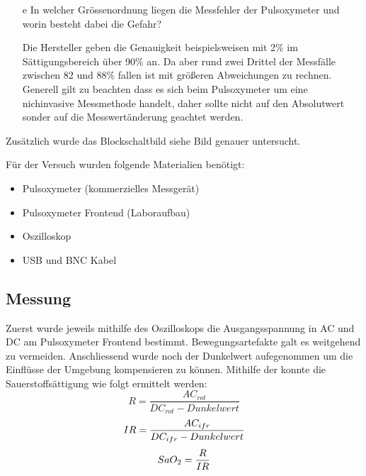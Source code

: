 \documentclass[11pt]{scrartcl}
\begin{document}
\begin{itemize}
\begin{equation}
        \end{equation}
        \item[e] In welcher Grössenordnung liegen die Messfehler der Pulsoxymeter und worin
        besteht dabei die Gefahr? 
        \item[] Die Hersteller geben die Genauigkeit beispielsweisen mit 2\% im Sättigungsbereich über 90\% an. 
        Da aber rund zwei Drittel der Messfälle zwischen 82 und 88\% fallen ist mit größeren Abweichungen zu rechnen. 
        Generell gilt zu beachten dass es sich beim Pulsoxymeter um eine nichinvasive Messmethode handelt, 
        daher sollte nicht auf den Absolutwert sonder auf die Messwertänderung geachtet werden. 
    \end{itemize}

    Zusätzlich wurde das Blockschaltbild siehe Bild genauer untersucht. 


    Für der Versuch wurden folgende Materialien benötigt:

    \begin{itemize}
        \item  Pulsoxymeter (kommerzielles Messgerät)
        \item Pulsoxymeter Frontend (Laboraufbau)
        \item Oszilloskop
        \item USB und BNC Kabel 
        
    \end{itemize}

    \subsection{Messung}
    Zuerst wurde jeweils mithilfe des Oszilloskops die Ausgangsspannung in AC und DC am Pulsoxymeter Frontend bestimmt. 
    Bewegungsartefakte galt es weitgehend zu vermeiden.
    Anschliessend wurde noch der Dunkelwert aufegenommen um die Einflüsse der Umgebung kompensieren zu können. 
    Mithilfe der \cite{Pulsoxymetrie} konnte die Sauerstoffsättigung wie folgt ermittelt werden:
    \begin{equation}
        R = \frac{AC_{rot}}{DC_{rot} - Dunkelwert} 
    \end{equation}
    \begin{equation}
        IR = \frac{AC_{ifr}}{DC_{ifr} - Dunkelwert} \\
    \end{equation}
    \begin{equation}
        SaO_{2} = \frac{R}{IR} \\
    \end{equation}
\end{document}
